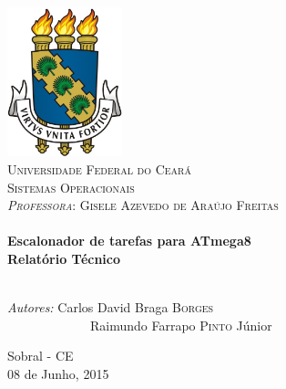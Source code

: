 
\begin{titlepage}
\begin{center}

\includegraphics[width=0.25\textwidth]{./brasao-ufc}~\\[1cm]

\textsc{\LARGE Universidade Federal do Ceará}\\[1.5cm]

\textsc{\Large Sistemas Operacionais}\\[0.2cm]
\textsc{\large \emph{Professora}: Gisele Azevedo de Araújo Freitas}\\[1.5cm]

\HRule \\[0.4cm]
{ \huge \bfseries Escalonador de tarefas para ATmega8 \\ Relatório Técnico\\[0.4cm] }
\HRule \\[1.8cm]

\begin{minipage}{0.7\textwidth}
\begin{flushleft} \large
\emph{Autores:}
Carlos David Braga \textsc{Borges} \\ \ \ \ \ \ \ \ \ \ \ \ \ \ Raimundo Farrapo \textsc{Pinto} Júnior \\
\large
\end{flushleft}
\end{minipage}

\vfill

{Sobral - CE \\ 08 de Junho, 2015}

\end{center}
\end{titlepage}